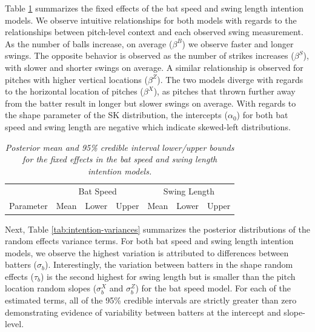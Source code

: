\documentclass{article}
\begin{document}
       Table \ref{tab:fixed-effects} summarizes the fixed effects of the bat speed and swing length intention models. We observe intuitive relationships for both models with regards to the relationships between pitch-level context and each observed swing measurement. As the number of balls increase, on average ($\beta^B$) we observe faster and longer swings. The opposite behavior is observed as the number of strikes increases ($\beta^S$), with slower and shorter swings on average. A similar relationship is observed for pitches with higher vertical locations ($\beta^Z$). The two models diverge with regards to the horizontal location of pitches ($\beta^X$), as pitches that thrown further away from the batter result in longer but slower swings on average. With regards to the shape parameter of the SK distribution, the intercepts ($\alpha_0$) for both bat speed and swing length are negative which indicate skewed-left distributions.

      \begin{table}
        \centering
        \begin{tabular}{l|rrr|rrr|}
                  & \multicolumn{3}{c|}{Bat Speed}          & \multicolumn{3}{c|}{Swing Length}  \\
        Parameter & Mean  & Lower  & Upper & Mean  & Lower  & Upper \\
          \hline
          
        \end{tabular}
        \caption{\it Posterior mean and 95\% credible interval lower/upper bounds for the fixed effects in the bat speed and swing length intention models.}
        \label{tab:fixed-effects}
      \end{table}

      Next, Table \ref{tab:intention-variances} summarizes the posterior distributions of the random effects variance terms. For both bat speed and swing length intention models, we observe the highest variation is attributed to differences between batters ($\sigma_b$). Interestingly, the variation between batters in the shape random effects ($\tau_b$) is the second highest for swing length but is smaller than the pitch location random slopes ($\sigma_b^X$ and $\sigma_b^Z$) for the bat speed model. For each of the estimated terms, all of the 95\% credible intervals are strictly greater than zero demonstrating evidence of variability between batters at the intercept and slope-level.
       
\end{document}
